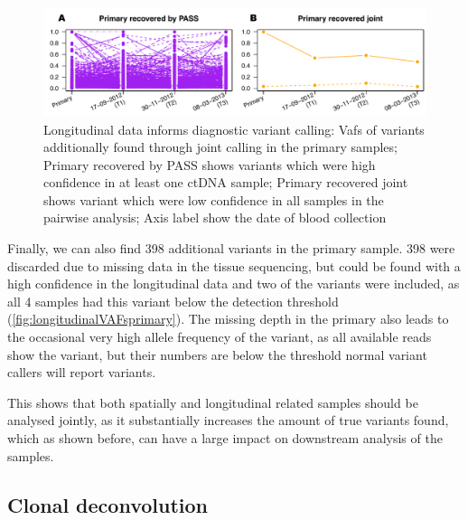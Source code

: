 \begin{figure}[!ht]
\centering
\includegraphics[width=.99\linewidth]{Figures/longitudinalCA9primaryVafs.pdf}
\caption[Longitudinal data informs diagnostic variant calling]{Longitudinal data informs diagnostic variant calling: Vafs of variants additionally found through joint calling in the primary samples; Primary recovered by PASS shows variants which were high confidence in at least one ctDNA sample; Primary recovered joint shows variant which were low confidence in all samples in the pairwise analysis; Axis label show the date of blood collection}\label{fig:longitudinalVAFsprimary}
\end{figure}


Finally, we can also find 398 additional variants in the   primary sample. 398 were discarded due to missing data in the tissue sequencing, but could be found with a high confidence in the longitudinal data and two of the variants were included, as all 4 samples had this variant below the detection threshold (\autoref{fig:longitudinalVAFsprimary}). The missing depth in the primary also leads to the occasional very high allele frequency of the variant, as all available reads show the variant, but their numbers are below the threshold normal variant callers will report variants.

This shows that both spatially and longitudinal related samples should be analysed jointly, as it substantially increases the amount of true variants found, which as shown before, can have a large impact on downstream analysis of the samples.



\subsection[Clonal deconvolution]{Clonal deconvolution}
\label{variantcalling-sec:clonal}

